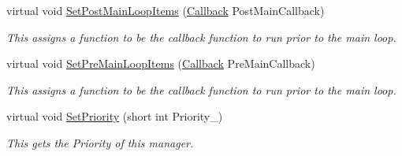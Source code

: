 \begin{DoxyCompactItemize}
virtual void \hyperlink{classMezzanine_1_1ManagerBase_a4ec52058f4c8a3f1c5fb20230b4fc301}{SetPostMainLoopItems} (\hyperlink{classMezzanine_1_1ManagerBase_ab23a9aa27c4e3cb58d902a149d3c6de2}{Callback} PostMainCallback)
\begin{DoxyCompactList}\small\item\em This assigns a function to be the callback function to run prior to the main loop. \item\end{DoxyCompactList}\item 
virtual void \hyperlink{classMezzanine_1_1ManagerBase_a84dd669c15e9db08c9efbc84c4fa3b0b}{SetPreMainLoopItems} (\hyperlink{classMezzanine_1_1ManagerBase_ab23a9aa27c4e3cb58d902a149d3c6de2}{Callback} PreMainCallback)
\begin{DoxyCompactList}\small\item\em This assigns a function to be the callback function to run prior to the main loop. \item\end{DoxyCompactList}\item 
virtual void \hyperlink{classMezzanine_1_1ManagerBase_ac71cd03e0a60427a1ee22637a3cc1b3e}{SetPriority} (short int Priority\_\-)
\begin{DoxyCompactList}\small\item\em This gets the Priority of this manager. \item\end{DoxyCompactList}\end{DoxyCompactItemize}
